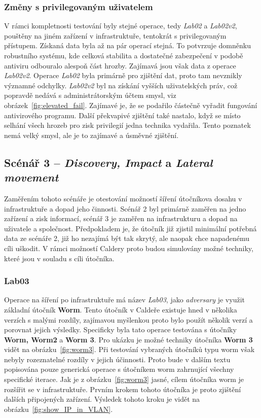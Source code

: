 

\subsubsection{Změny s privilegovaným uživatelem}
V rámci kompletnosti testování byly stejné operace, tedy \textit{Lab02} a \textit{Lab02v2}, pouštěny na jiném zařízení v infrastruktuře, tentokrát s privilegovaným přístupem.
Získaná data byla až na pár operací stejná.
To potvrzuje domněnku robustního systému, kde celková stabilita a dostatečné zabezpečení v podobě antiviru odbouralo alespoň část hrozby.
Zajímavá jsou však data z operace \textit{Lab02v2}.
Operace \textit{Lab02} byla primárně pro zjištění dat, proto tam nevznikly významné odchylky.
\textit{Lab02v2} byl na získání vyšších uživatelských práv, což popravdě nedává s administrátorským účtem smysl, viz obrázek~\ref{fig:elevated_fail}.
Zajímavé je, že se podařilo částečně vyřadit fungování antivirového programu.
Další překvapivé zjištění také nastalo, když se místo selhání všech hrozeb pro zisk privilegií jedna technika vydařila.
Tento poznatek nemá velký smysl, ale je to zajímavé a úsměvné zjištění.



\subsection{Scénář 3 -- \textit{Discovery, Impact} a \textit{Lateral movement}}
Zaměřením tohoto scénáře je otestování možností šíření útočníkova dosahu v infrastruktuře a dopad jeho činnosti.
Scénář 2 byl primárně zaměřen na jedno zařízení a zisk informací, scénář 3 je zaměřen na infrastrukturu a dopad na uživatele a společnost.
Předpokladem je, že útočník již zjistil minimální potřebná data ze scénáře 2, již ho nezajímá být tak skrytý, ale naopak chce napadenému cíli uškodit.
V rámci možností Caldery proto budou simulovány možné techniky, které jsou v souladu s cíli útočníka.

\subsubsection{Lab03}
Operace na šíření po infrastruktuře má název \textit{Lab03}, jako \textit{adversary} je využit základní útočník \textbf{Worm}.
Tento útočník v Caldeře existuje hned v několika verzích s malými rozdíly, zajímavou myšlenkou proto bylo použít několik verzí a porovnat jejich výsledky.
Specificky byla tato operace testována s útočníky \textbf{Worm, Worm2} a \textbf{Worm 3}.
Pro ukázku je možné techniky útočníka \textbf{Worm 3} vidět na obrázku~\ref{fig:worm3}.
Při testování vybraných útočníků typu worm však nebyly rozeznatelné rozdíly v jejich účinnosti.
Proto bude v dalším textu popisována pouze generická operace s útočníkem worm zahrnující všechny specifické iterace.
Jak je z obrázku~\ref{fig:worm3} jasné, cílem útočníka worm je rozšířit se v infrastruktuře.
Prvním krokem tohoto útočníka je proto zjištění dalších připojených zařízení.
Výsledek tohoto kroku je vidět na obrázku~\ref{fig:show_IP_in_VLAN}.

